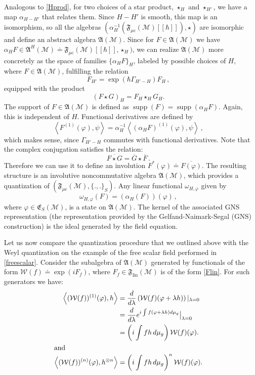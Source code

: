 \documentclass[12pt]{article}
\newcommand{\E}{\mathfrak{E}}
\newcommand{\fA}{\mathfrak{A}}
\newcommand{\F}{\mathfrak{F}}
\newcommand{\Mcal}{\mathcal{M}}
\newcommand{\Wcal}{\mathcal{W}}
\DeclareMathOperator{\supp}{\mathrm{supp}}      %
\newcommand{\mc}{{\mu\mathrm{c}}}
\newcommand{\al}{\alpha}
\newcommand{\ph}{\varphi}
\newcommand{\om}{\omega}
\newcommand{\Poi}[2]{\{#1,#2\}}
\newcommand{\sst}[1]{\scriptscriptstyle{#1}}  %
\newcommand{\1}{\mathds{1}}                         %
\newcommand{\be}{\begin{equation}}
\newcommand{\ee}{\end{equation}}
\begin{document}
{{\begin{exa}
\end{exa}
Analogous to \eqref{Hprod}, for two choices of a star product, $\star_H$ and $\star_{H'}$, we have a map $\al_{H-H'} $ that relates them. Since $H-H'$ is smooth, this map is an isomorphism, so all the algebras $(\al_H^{-1}(\F_\mc(\Mcal)[[\hbar]]),\star)$ are isomorphic and define an abstract algebra $\fA(\Mcal)$. Since for $F \in \fA(\Mcal)$ we have $\al_HF\in \fA^{\sst H}(\Mcal)\doteq\F_{\mc}(\Mcal)[[\hbar]],\star_H)$, we can realize $\fA(\Mcal)$ more concretely as the space of families $\{ \al_HF \}_H$,  labeled by possible choices of $H$, where  $F \in \fA(\Mcal)$, fulfilling the relation
\[
 F_{H'} = \exp(\hbar \Gamma_{H'-H}) F_H\,,
\]
equipped with the product
\[
 (F \star G)_H = F_H \star_H G_H.
\]
The support of $F \in \fA(\Mcal)$ is defined as $\supp(F) = \supp(\al_HF)$. Again, this is independent of $H$. Functional derivatives are defined by
\[
\left<F^{(1)}(\ph),\psi\right> = \al_H^{-1}\left<(\al_HF)^{(1)}(\ph),\psi\right>\,,
\]
which makes sense, since $\Gamma_{H'-H}$ commutes with functional derivatives. Note that the complex conjugation satisfies the relation:
\be
\overline{F\star G}=\overline{G}\star\overline{F}\,.
\ee
Therefore we can use it to define an involution  $F^*(\ph)\doteq\overline{F(\ph)}$. The resulting structure is an involutive noncommutative algebra $\fA(\Mcal)$, which provides a quantization of $(\F_{\mc}(\Mcal),\Poi{.}{.}_S)$. Any linear functional $\omega_{H,\ph}$ given by
 \be\label{vacuum}
 \om_{H,\ph}(F)=(\al_H(F))(\ph)\,,
 \ee 
 where $\ph\in\E_S(\Mcal)$, is a state on $\fA(\Mcal)$. The kernel of the associated GNS representation  (the representation provided by the Gelfand-Naimark-Segal
 (GNS) construction) is the ideal generated by the field equation.

Let us now compare the quantization procedure that we outlined above with the Weyl quantization on the example of the free scalar field performed in \ref{freescalar}. Consider the subalgebra of $\fA(\Mcal)$ generated by functionals of the form $\Wcal(f)\doteq\exp(iF_f)$, where $F_f\in \F_{\textrm{lin}}(\Mcal)$ is of the form \eqref{Flin}. For such generators we have:
\begin{align*}
\left< (\Wcal(f))^{(1)}(\ph),h\right>&= \frac{d}{d\lambda}\left( \Wcal(f) (\ph + \lambda h)\right)|_{\lambda=0}\\
&= \frac{d}{d \lambda}  e^{i \int  f (\ph + \lambda h)d\mu_g} \big|_{\lambda=0}\\
&=\left( i \int f h\,d\mu_g\right) \Wcal(f)(\ph).\\
\intertext{and}
\left<(\Wcal(f))^{(n)}(\ph),h^{\otimes n}\right>&=  \left( i \int f h\,d\mu_g\right)^n \Wcal(f)(\ph).
\end{align*}

}}
\end{document}
